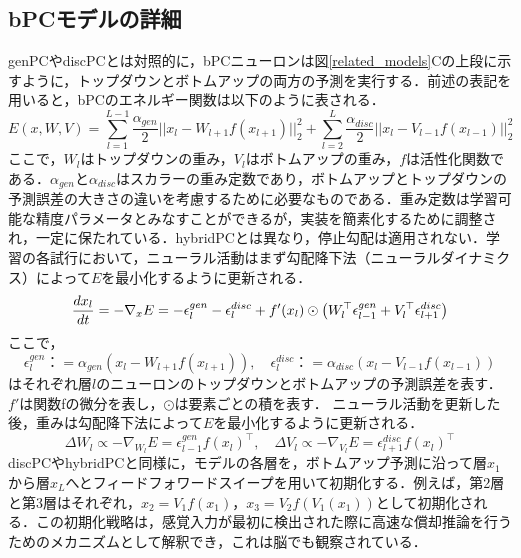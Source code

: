 \documentclass[a4paper, titlepage]{jsarticle}
\begin{document}
\subsection{bPCモデルの詳細}
genPCやdiscPCとは対照的に，bPCニューロンは図\ref{related_models}Cの上段に示すように，トップダウンとボトムアップの両方の予測を実行する．前述の表記を用いると，bPCのエネルギー関数は以下のように表される．
\begin{equation}\label{bPC_Energy}
   E(x,W,V)=\sum_{l=1}^{L-1}\frac{\alpha_{gen}}{2}||x_l-W_{l+1}f(x_{l+1})||_2^2+\sum_{l=2}^L\frac{\alpha_{disc}}{2}||x_l-V_{l-1}f(x_{l-1})||_2^2
\end{equation}
ここで，$W_l$はトップダウンの重み，$V_l$はボトムアップの重み，$f$は活性化関数である．$\alpha_{gen}$と$\alpha_{disc}$はスカラーの重み定数であり，ボトムアップとトップダウンの予測誤差の大きさの違いを考慮するために必要なものである．重み定数は学習可能な精度パラメータとみなすことができるが，実装を簡素化するために調整され，一定に保たれている．hybridPCとは異なり，停止勾配は適用されない．学習の各試行において，ニューラル活動はまず勾配降下法（ニューラルダイナミクス）によって$E$を最小化するように更新される．
\begin{equation}\label{neural_activety}
   \frac{dx_l}{dt}=-\nabla_xE=-\epsilon_l^{gen}-\epsilon_l^{disc}+f'(x_l)\odot\qty(W_l^\top\epsilon_{l-1}^{gen}+V_l^\top\epsilon_{l+1}^{disc})
\end{equation}
ここで，
\begin{equation}
   \epsilon_l^{gen}：=\alpha_{gen}(x_l-W_{l+1}f(x_{l+1})),\quad\epsilon_l^{disc}：=\alpha_{disc}(x_l-V_{l-1}f(x_{l-1}))
\end{equation}
はそれぞれ層$l$のニューロンのトップダウンとボトムアップの予測誤差を表す．$f'$は関数fの微分を表し，$\odot$は要素ごとの積を表す．
ニューラル活動を更新した後，重みは勾配降下法によって$E$を最小化するように更新される．
\begin{equation}\label{E_minimize}
   \Delta W_l\propto-\nabla_{W_l}E=\epsilon_{l-1}^{gen}f(x_l)^\top,\quad\Delta V_l\propto-\nabla_{V_l}E=\epsilon_{l+1}^{disc}f(x_l)^\top
\end{equation}
discPCやhybridPCと同様に，モデルの各層を，ボトムアップ予測に沿って層$x_1$から層$x_L$へとフィードフォワードスイープを用いて初期化する．例えば，第2層と第3層はそれぞれ，$x_2=V_1f(x_1)$，$x_3=V_2f(V_1(x_1))$\;として初期化される．この初期化戦略は，感覚入力が最初に検出された際に高速な償却推論を行うためのメカニズムとして解釈でき，これは脳でも観察されている．
\end{document}
